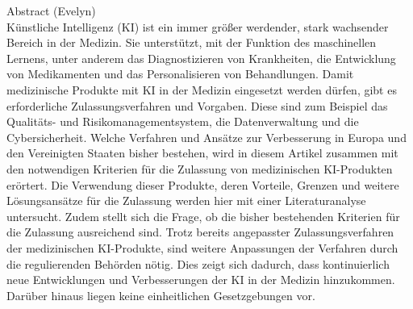 {\centering
{\large Abstract (Evelyn)\\}
}
Künstliche Intelligenz (KI) ist ein immer größer werdender, 
stark wachsender Bereich in der Medizin. Sie unterstützt, 
mit der Funktion des maschinellen Lernens, unter anderem das Diagnostizieren von Krankheiten, 
die Entwicklung von Medikamenten und das Personalisieren von Behandlungen. 
Damit medizinische Produkte mit KI in der Medizin eingesetzt werden dürfen, 
gibt es erforderliche Zulassungsverfahren und Vorgaben. 
Diese sind zum Beispiel das Qualitäts- und Risikomanagementsystem, die Datenverwaltung und die Cybersicherheit. 
Welche Verfahren und Ansätze zur Verbesserung in Europa und den Vereinigten Staaten bisher bestehen, 
wird in diesem Artikel zusammen mit den notwendigen Kriterien für die Zulassung von medizinischen KI-Produkten erörtert. 
Die Verwendung dieser Produkte, 
deren Vorteile, Grenzen und weitere Lösungsansätze für die Zulassung werden hier mit einer Literaturanalyse untersucht.
Zudem stellt sich die Frage, 
ob die bisher bestehenden Kriterien für die Zulassung ausreichend sind. 
Trotz bereits angepasster Zulassungsverfahren der medizinischen KI-Produkte, sind weitere Anpassungen der Verfahren durch die regulierenden Behörden nötig.
Dies zeigt sich dadurch, dass kontinuierlich neue Entwicklungen und Verbesserungen der KI in der Medizin hinzukommen. Darüber hinaus liegen keine einheitlichen Gesetzgebungen vor.

